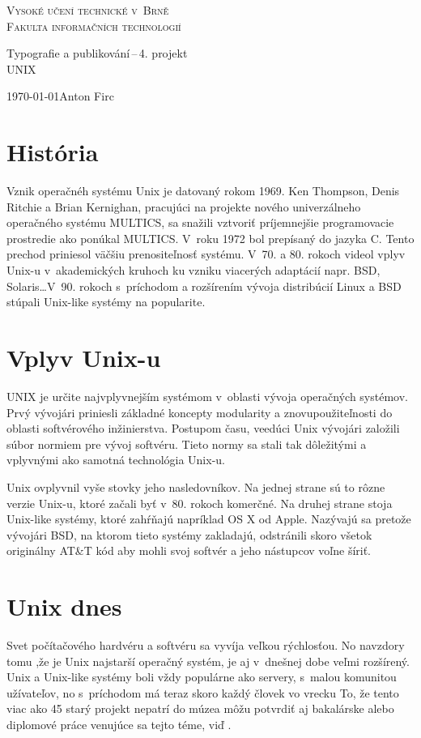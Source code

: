 \documentclass[a4paper, 11pt]{article}
\begin{document}
	
	\begin{titlepage}
		\begin{center}
			\Huge{\textsc{Vysoké učení technické v~Brně\\}}
			\huge{\textsc{Fakulta informačních technologií}}
			
			\Large {Typografie a publikování\,--\,4. projekt\\}
			\huge{UNIX}
		\end{center}
		{\Large \today \hfill Anton Firc}
	\end{titlepage}	
	
	\section*{História}
	
	Vznik operačnéh systému Unix je datovaný rokom 1969. Ken Thompson, Denis Ritchie a Brian Kernighan, pracujúci na projekte nového univerzálneho operačného systému MULTICS, sa snažili vztvoriť príjemnejšie programovacie prostredie ako ponúkal MULTICS. V~roku 1972 bol prepísaný do jazyka C. Tento prechod priniesol väčšiu prenositeľnosť systému. V~70. a 80. rokoch videol vplyv Unix-u v~akademických kruhoch ku vzniku viacerých adaptácií napr. BSD, Solaris\ldots V~90. rokoch s~príchodom a rozšírením vývoja distribúcií Linux a BSD stúpali Unix-like systémy na popularite.
	
	\section*{Vplyv Unix-u}
	UNIX je určite najvplyvnejším systémom v~oblasti vývoja operačných systémov. Prvý vývojári priniesli základné koncepty modularity a znovupoužiteľnosti do oblasti softvérového inžinierstva. Postupom času, veedúci Unix vývojári založili súbor normiem pre vývoj softvéru. Tieto normy sa stali tak dôležitými a vplyvnými ako samotná technológia Unix-u.
	
	 Unix ovplyvnil vyše stovky jeho nasledovníkov. Na jednej strane sú to rôzne verzie Unix-u, ktoré začali byť v~80. rokoch komerčné. Na druhej strane stoja Unix-like systémy, ktoré zahŕňajú napríklad OS X od Apple. Nazývajú sa  pretože vývojári BSD, na ktorom tieto systémy zakladajú, odstránili skoro všetok originálny AT\&T kód aby mohli svoj softvér a jeho nástupcov voľne šíriť.
	
	\section*{Unix dnes}
	Svet počítačového hardvéru a softvéru sa vyvíja veľkou rýchlosťou. No navzdory tomu ,že je Unix najstarší operačný systém, je aj v~dnešnej dobe veľmi rozšírený. Unix a Unix-like systémy boli vždy populárne ako servery, s~malou komunitou užívateľov, no s~príchodom  má teraz skoro každý človek vo vrecku  To, že tento viac ako 45 starý projekt nepatrí do múzea môžu potvrdiť aj bakalárske alebo diplomové práce venujúce sa tejto téme, viď \cite{prac2} \cite{prac1}.
	
\end{document}

